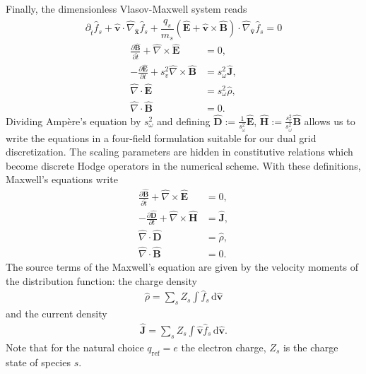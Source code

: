 \documentclass[english]{article}
\newcommand{\bx}{\textbf{x}}
\newcommand{\bv}{\textbf{v}}
\newcommand{\bB}{\textbf{B}}
\newcommand{\bH}{\textbf{H}}
\newcommand{\bE}{\textbf{E}}
\newcommand{\bD}{\textbf{D}}
\newcommand{\bJ}{\textbf{J}}
\newcommand{\du}{\,\mathrm{d}}
\newcommand{\qr}{q_{\mathrm{ref}}}
\newcommand{\nablaht}{\hat{\nabla}}
\newcommand{\nablaxht}{\hat{\nabla}_{\xht}}
\newcommand{\nablavht}{\hat{\nabla}_{\vht}}
\newcommand{\tht}{\hat{t}}
\newcommand{\xht}{\hat{\bx}}
\newcommand{\vht}{\hat{\bv}}
\newcommand{\qht}{\hat{q}}
\newcommand{\mht}{\hat{m}}
\newcommand{\Eht}{\hat{\bE}}
\newcommand{\Dht}{\hat{\bD}}
\newcommand{\Bht}{\hat{\bB}}
\newcommand{\Hht}{\hat{\bH}}
\newcommand{\Jht}{\hat{\bJ}}
\newcommand{\rhoht}{\hat{\rho}}
\newcommand{\fht}{\hat{f}}
\begin{document}
Finally, the dimensionless Vlasov-Maxwell system reads
\begin{equation}\label{eq:Vlasovt}
	\partial_{\tht} \fht_s + \vht \cdot \nablaxht \fht_s +  \frac{\qht_s}{\mht_s} \left( \Eht + \vht \times \Bht \right) \cdot \nablavht \fht_s = 0
\end{equation}
\begin{subequations}
	\begin{align}
		\frac{\partial \Bht}{\partial \tht} + \nablaht \times \Eht      & = 0 ,               \\
		-  \frac{\partial \Eht}{\partial t} + s_v^2\nablaht \times \Bht & = s_\omega^2\Jht ,  \\
		\nablaht \cdot \Eht                                             & = s_\omega^2\rhoht, \\
		\nablaht \cdot \Bht                                             & = 0.
	\end{align}
\end{subequations}
Dividing Amp\`ere's equation by $s_\omega^2$ and defining $\Dht := \frac{1}{s_\omega^2} \Eht$, $\Hht := \frac{s_v^2}{s_\omega^2} \Bht$ allows us to write the equations in a four-field formulation suitable for our dual grid discretization. The scaling parameters are hidden in constitutive relations which become discrete Hodge operators in the numerical scheme. With these definitions, Maxwell's equations write
\begin{subequations}
	\begin{align}
		\frac{\partial \Bht}{\partial \tht} + \nablaht \times \Eht & = 0 ,     \\
		-  \frac{\partial \Dht}{\partial t} + \nablaht \times \Hht & = \Jht ,  \\
		\nablaht \cdot \Dht                                        & = \rhoht, \\
		\nablaht \cdot \Bht                                        & = 0.
	\end{align}
\end{subequations}
The source terms of the Maxwell's equation are given by the velocity moments of the distribution function: the charge density
\begin{align*}
	\rhoht= \sum_s Z_s \int \fht_s \du\vht
\end{align*}
and the current density
\begin{align*}
	\Jht =\sum_s Z_s\int \vht \fht_s \du\vht.
\end{align*}
Note that for the natural choice $\qr=e$ the electron charge, $Z_s$ is the charge state of species $s$.
\end{document}
